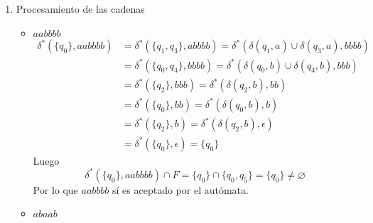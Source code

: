 \documentclass{article}
\begin{document}
\begin{enumerate}
{\begin{itemize}
\begin{enumerate}
{\begin{center}
\begin{figure}[H]
                			\caption{$M$ que reconoce a $L$}
                		\end{figure}
                		\end{center}
                	}
                	\item{
                	 Procesamiento de las cadenas
                	\begin{itemize}
                		\item {
                			$aabbbb$
                			\begin{align*}
                			\delta^{*}(\{q_{0}\}, aabbbb) 
                			&= \delta^{*}(\{q_{1}, q_{3}\}, abbbb) 
                			= \delta^{*}(\delta(q_{1}, a) 
                			\cup \delta(q_{3}, a), bbbb) \\
                			&= \delta^{*}(\{q_{0}, q_{4}\}, bbbb) 
                			= \delta^{*}(\delta(q_{0}, b) 
                			\cup \delta(q_{4}, b), bbb) \\
                			&= \delta^{*}(\{q_{2}\}, bbb) 
                			= \delta^{*}(\delta(q_{2}, b), bb) \\
                			&= \delta^{*}(\{q_{0}\}, bb) 
                			= \delta^{*}(\delta(q_{0}, b), b) \\
                			&= \delta^{*}(\{q_{2}\}, b) 
                			= \delta^{*}(\delta(q_{2}, b), \epsilon) \\
                			&= \delta^{*}(\{q_{0}\}, \epsilon) 
                			=  \{q_{0}\}
                			\end{align*}
                			Luego 
                			\[\delta^{*}(\{q_{0}\}, aabbbb) \cap F = 
                			\{q_{0}\} \cap \{q_{0}, q_{5}\}
                			= \{q_{0}\} \neq \varnothing\]
                			Por lo que $aabbbb$ sí es aceptado por el 
                			autómata.
                		}
                		\item {
                			$abaab$
                			\begin{align*}

\end{align*}}
\end{itemize}}
\end{enumerate}
\end{itemize}}
\end{enumerate}
\end{document}
